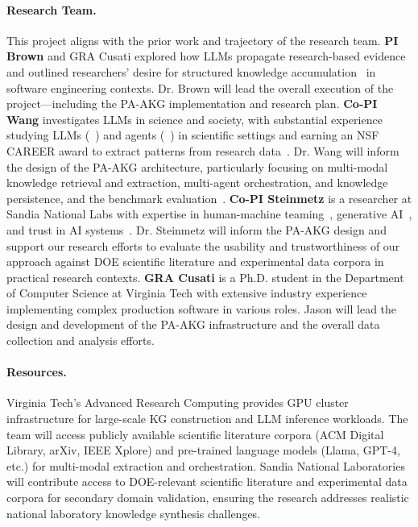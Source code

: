 \documentclass{files/proposalnsf}
\begin{document}
\paragraph{Research Team.} This project aligns with the prior work and trajectory of the research team.
\textbf{PI Brown} and GRA Cusati explored how LLMs propagate research-based evidence~\cite{brown2025esem} and outlined researchers' desire for structured knowledge accumulation~\cite{cusati2026fose} in software engineering contexts. Dr. Brown will lead the overall execution of the project---including the PA-AKG implementation and research plan. \textbf{Co-PI Wang} investigates LLMs in science and society, with substantial experience studying LLMs (\ie~\cite{bi2024ai,srivastava2025llmthinkbench}) and agents (\ie~\cite{lu2024triageagent,latimer2025hindsight}) in scientific settings and earning an NSF CAREER award to extract patterns from research data~\cite{wang_career}. Dr. Wang will inform the design of the PA-AKG architecture, particularly focusing on multi-modal knowledge retrieval and extraction, multi-agent orchestration, and knowledge persistence, and the benchmark evaluation~\cite{srivastava2025beyondbench}. \textbf{Co-PI Steinmetz} is a researcher at Sandia National Labs with expertise in human-machine teaming~\cite{chance2023towards,powell2021coordination}, generative AI~\cite{krofcheck2023overview,layton2025mstd}, and trust in AI systems~\cite{steinmetz2025trust,naugle2025trusted}. Dr. Steinmetz will inform the PA-AKG design and support our research efforts to evaluate the usability and trustworthiness of our approach against DOE scientific literature and experimental data corpora in practical research contexts. \textbf{GRA Cusati} is a Ph.D. student in the Department of Computer Science at Virginia Tech with extensive industry experience implementing complex production software in various roles. Jason will lead the design and development of the PA-AKG infrastructure and the overall data collection and analysis efforts.

\paragraph{Resources.} Virginia Tech's Advanced Research Computing provides GPU cluster infrastructure for large-scale KG construction and LLM inference workloads. The team will access publicly available scientific literature corpora (\eg ACM Digital Library, arXiv, IEEE Xplore) and pre-trained language models (\eg Llama, GPT-4, etc.) for multi-modal extraction and orchestration. Sandia National Laboratories will contribute access to DOE-relevant scientific literature and experimental data corpora for secondary domain validation, ensuring the research addresses realistic national laboratory knowledge synthesis challenges.




\end{document}
